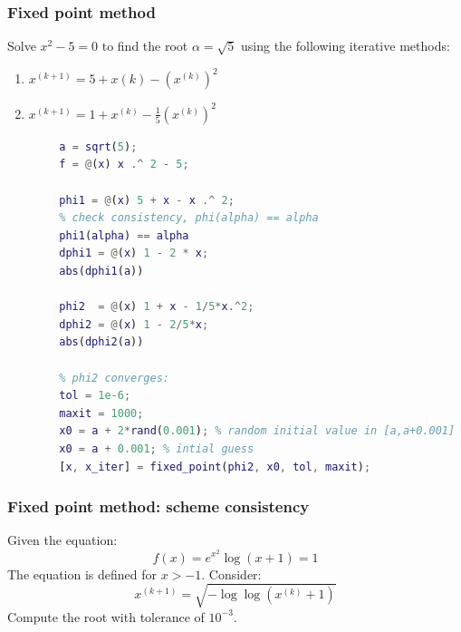     \subsubsection{Fixed point method}
        Solve $x^2-5=0$ to find the root $\alpha=\sqrt{5}$ using the following iterative methods:
        \begin{enumerate}
            \item $x^{(k+1)}=5+x{(k)}-\left(x^{(k)}\right)^2$
            \item $x^{(k+1)}=1+x^{(k)}-\frac{1}{5}\left(x^{(k)}\right)^2$
        \end{enumerate}
        \begin{lstlisting}[language=Matlab, escapeinside=`', gobble=8]
        % fixed point convergent if |phi'(alpha)| < 1, if > 1 diverges, if == 1 idk
        a = sqrt(5);
        f = @(x) x .^ 2 - 5;

        phi1 = @(x) 5 + x - x .^ 2;
        % check consistency, phi(alpha) == alpha
        phi1(alpha) == alpha
        dphi1 = @(x) 1 - 2 * x;
        abs(dphi1(a))

        phi2  = @(x) 1 + x - 1/5*x.^2;
        dphi2 = @(x) 1 - 2/5*x;
        abs(dphi2(a))

        % phi2 converges:
        tol = 1e-6;
        maxit = 1000;
        x0 = a + 2*rand(0.001); % random initial value in [a,a+0.001]
        x0 = a + 0.001; % intial guess
        [x, x_iter] = fixed_point(phi2, x0, tol, maxit);
        \end{lstlisting}

    \subsubsection{Fixed point method: scheme consistency}
        Given the equation:
        $$
        f(x)=e^{x^2}\log(x+1)=1
        $$
        The equation is defined for $x>-1$. Consider:
        $$
        x^{(k+1)}=\sqrt{-\log\log\left(x^{(k)}+1\right)}
        $$
        Compute the root with tolerance of $10^{-3}$.

